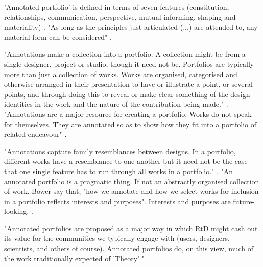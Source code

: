 'Annotated portfolio' is defined in terms of seven features (constitution, relationships, communication, perspective, mutual informing, shaping and materiality) \autocite[p. 71]{bowers_annotated_2012}. "As long as the principles just articulated (...) are attended to, any material form can be considered" \autocite[p. 73]{bowers_annotated_2012}.

"Annotations make a collection into a portfolio. A collection might be from a single designer, project or studio, though it need not be. Portfolios are typically more than just a collection of works. Works are organised, categorised and otherwise arranged in their presentation to have or illustrate a point, or several points, and through doing this to reveal or make clear something of the design identities in the work and the nature of the contribution being made." \autocite[p. 71]{bowers_annotated_2012}. "Annotations are a major resource for creating a portfolio. Works do not speak for themselves. They are annotated so as to show how they fit into a portfolio of related endeavour" \autocite[p. 71]{bowers_annotated_2012}.

"Annotations capture family resemblances between designs. In a portfolio, different works have a resemblance to one another but it need not be the case that one single feature has to run through all works in a portfolio." \autocite[p. 71]{bowers_annotated_2012}. "An annotated portfolio is a pragmatic thing. If not an abstractly organised collection of work. Bower say that; "how we annotate and how we select works for inclusion in a portfolio reflects interests and purposes". Interests and purposes are future-looking. \autocite[p. 73]{bowers_annotated_2012}.

"Annotated portfolios are proposed as a major way in which RtD might cash out its value for the communities we typically engage with (users, designers, scientists, and others of course). Annotated portfolios do, on this view, much of the work traditionally expected of 'Theory' " \autocite[p. 73]{bowers_annotated_2012}.
